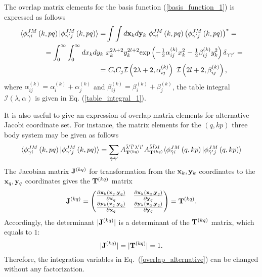 \documentclass[
12pt, %
oneside, %
english, %
doublespacing, %
doublespacing, %
toctotoc, %
parskip, %
headsepline, %
]{MastersDoctoralThesis} %
\begin{document}
The overlap matrix elements for the basis function (\ref{basis_function_1}) is expressed as follows
\begin{align}
\langle \phi^{ J M}_{\gamma i}\left(k, pq \right) \vert 
\phi^{ J M}_{\gamma^{\prime}j}\left(k, pq \right) \rangle=&
 \int \int d{\bf x}_k d{\bf y}_k 
 ~\phi^{ J M}_{\gamma i}\left(k, pq \right) 
 \left( \phi^{ J M}_{\gamma^{\prime} j}\left(k, pq \right) \right)^{*}
 = \label{overlap_in_basic_set}
\\ 
=\int_0^\infty \int_0^\infty  dx_k dy_k~ & x_k^{2\lambda+2}y_k^{2 l +2} {\rm exp}\left( - \tfrac{1}{2}\alpha^{(k)}_{ij} x^2_k - \tfrac{1}{2} \beta^{(k)}_{ij} y^2_k \right) \delta_{\gamma \gamma'} =
 \nonumber \\ 
=&~ 
 C_i C_j
\mathcal{I} \left( 2\lambda+2,\alpha_{ij}^{(k)} \right)~ \mathcal{I} \left(2l+2,\beta_{ij}^{(k)} \right) ,\nonumber
\end{align} 
where
$
\alpha_{ij}^{(k)}=\alpha_{i}^{(k)}+\alpha_{j}^{(k)}$ and $
\beta_{ij}^{(k)}=\beta_{i}^{(k)}+\beta_{j}^{(k)}
$,
the table integral $\mathcal{I}(\lambda, \alpha)$ is given in Eq. (\ref{table_integral_1}).


It is also useful to give an expression of overlap matrix elements for alternative Jacobi coordinate set. For instance, the matrix elements for the $(q,kp)$ three body system may be given as follows
\begin{equation}
\langle \phi^{ J M}_{\gamma i}\left(k,pq \right) \vert 
\phi^{ J M}_{\gamma^{\prime}j}\left(k,pq \right) \rangle
=
\sum_{\tilde{\gamma} \tilde{\gamma}'}
A^{\tilde{\lambda}' \tilde{l}' \lambda' l'}_{{\bf T}^{(kq)} }
A^{\tilde{\lambda} \tilde{l} \lambda l}_{{\bf T}^{(kq)} }
\langle \phi^{ J M}_{\tilde{\gamma}i}\left(q,kp \right) \vert 
\phi^{ J M}_{\tilde{\gamma}^{\prime}j}\left(q,kp \right) \rangle
\label{overlap_alternative}
\end{equation}
The Jacobian  matrix ${\bf J}^{(kq)}$ for transformation from the ${\bf x}_k, {\bf y}_k$ coordinates to the ${\bf x}_q, {\bf y}_q$ coordinates gives the ${\bf T}^{(kq)}$ matrix
\begin{equation}
{\bf J}^{(kq)} = 
\begin{pmatrix}
\frac{\partial {\bf x}_k \left({\bf x}_q,{\bf y}_q \right)}{ \partial {\bf x}_q }  
& \frac{\partial {\bf x}_k \left({\bf x}_q,{\bf y}_q \right)}{ \partial {\bf y}_q } \\
\frac{\partial {\bf y}_k \left({\bf x}_q,{\bf y}_q \right)}{ \partial {\bf x}_q }  
& \frac{\partial {\bf y}_k \left({\bf x}_q,{\bf y}_q \right)}{ \partial {\bf y}_q } 
\end{pmatrix} = {\bf T}^{(kq)}.
\end{equation}
Accordingly, the determinant $\vert {\bf J}^{(kq)} \vert$ is a determinant of the ${\bf T}^{(kq)}$ matrix, which equals to $1$:
\begin{equation}
\vert {\bf J}^{(kq)} \vert = \vert {\bf T}^{(kq)} \vert =1.
\end{equation}
  Therefore, the integration variables in Eq.~(\ref{overlap_alternative}) can be changed without any factorization. 
\end{document}
